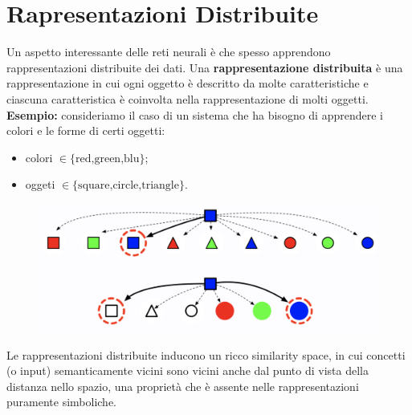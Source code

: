 \section{Rapresentazioni Distribuite}
Un aspetto interessante delle reti neurali è che spesso apprendono rappresentazioni distribuite dei dati.
\newline
Una \textbf{rappresentazione distribuita} è una rappresentazione in cui ogni oggetto è descritto da molte
caratteristiche e ciascuna caratteristica è coinvolta nella rappresentazione di molti oggetti.
\newline
\newline
\textbf{Esempio:} consideriamo il caso di un sistema che ha bisogno di apprendere i colori e le forme di certi
oggetti:
\begin{itemize}
  \item colori $\in\{\text{red,green,blu}\}$;
  \item oggeti $\in\{\text{square,circle,triangle}\}$.
\end{itemize}
\begin{figure}[!h]
  \centering
  \includegraphics[scale=.5]{images/representation_learning/example01.png}
\end{figure}


Le rappresentazioni distribuite inducono un ricco similarity space, in cui concetti (o input) semanticamente 
vicini sono vicini anche dal punto di vista della distanza nello spazio, una proprietà che è assente nelle 
rappresentazioni puramente simboliche.


